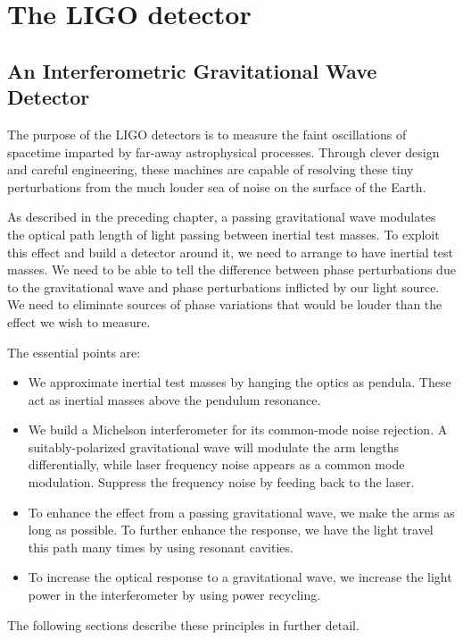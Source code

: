 \chapter{The LIGO detector}
\label{chapter2}

\section{An Interferometric Gravitational Wave Detector}

The purpose of the LIGO detectors is to measure the faint
oscillations of spacetime imparted by far-away astrophysical
processes.  Through clever design and careful engineering, these
machines are capable of resolving these tiny perturbations from the
much louder sea of noise on the surface of the Earth\cite{Saulson1994Fundamentals}.

As described in the preceding chapter, a passing gravitational wave modulates the optical
path length of light passing between inertial test
masses.  To exploit this effect and build a detector around it, we
need to arrange to have inertial test masses.  We need to be able to
tell the difference between phase perturbations due to the
gravitational wave and phase perturbations inflicted by our light
source.  We need to eliminate sources of phase variations that would
be louder than the effect we wish to measure.  

The essential points are:
\begin{itemize}
\item We approximate inertial test masses by hanging the optics as
  pendula.  These act as inertial masses above the pendulum resonance.
\item We build a Michelson interferometer for its common-mode noise
  rejection.  A suitably-polarized gravitational wave will modulate
  the arm lengths differentially, while laser frequency noise appears
  as a common mode modulation.  Suppress the frequency noise by
  feeding back to the laser.
\item To enhance the effect from a passing gravitational wave, we make
  the arms as long as possible.  To further enhance the response, we
  have the light travel this path many times by using resonant cavities.
\item To increase the optical response to a gravitational wave, we
  increase the light power in the interferometer by using power
  recycling.
\end{itemize}
The following sections describe these principles in further detail.
